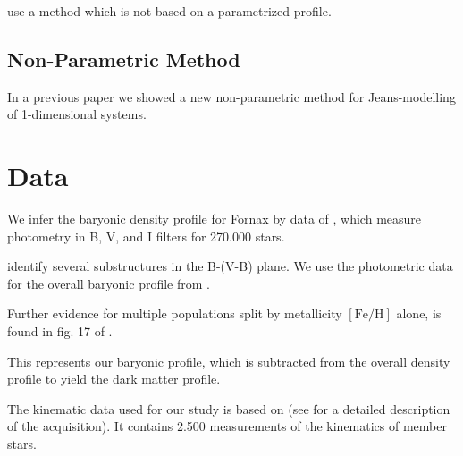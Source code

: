 

\citep{Ibata+2013} use a method which is not based on a parametrized profile. %



\subsection{Non-Parametric Method}
In a previous paper  we showed a new non-parametric
method for Jeans-modelling of 1-dimensional systems.



\section{Data}
We infer the baryonic density profile for Fornax by data of
\cite{DeBoer+2012b}, which measure photometry in B, V, and I filters
for 270.000 stars.


\cite{DeBoer+2013} identify several substructures in the B-(V-B)
plane.  
We use the photometric data for the overall baryonic profile from \cite{DeBoer+2013}.

Further evidence for multiple populations split by metallicity
$[\text{Fe}/\text{H}]$ alone, is found in fig. 17 of
\citep{Hendricks+2014}.






This represents our baryonic profile, which is subtracted from the
overall density profile to yield the dark matter profile.


The kinematic data used for our study is based on \citep{WalkerMateoOlszewski2009b}
(see \citep{WalkerMateoOlszewski2009a} for a detailed description of the
acquisition). It contains 2.500 measurements of the kinematics of member stars.





